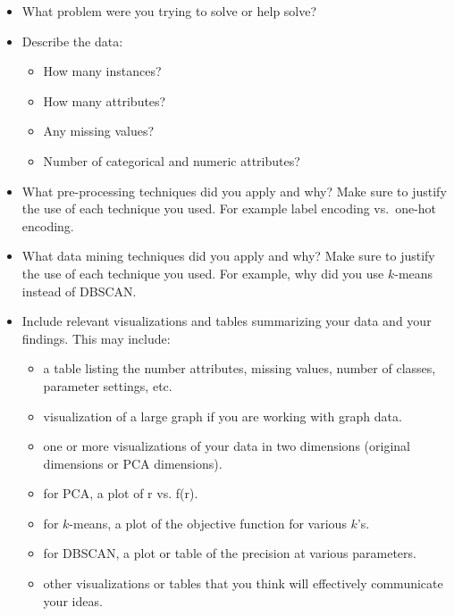 \documentclass[11pt]{article}
\begin{document}
\begin{itemize}
    \item What problem were you trying to solve or help solve?

    \item Describe the data:
    \begin{itemize}
        \item How many instances?
        \item How many attributes?
        \item Any missing values?
        \item Number of categorical and numeric attributes?
    \end{itemize}

    \item What pre-processing techniques did you apply and why? Make sure to
    justify the use of each technique you used. For example label encoding
    vs.~one-hot encoding.

    \item What data mining techniques did you apply and why? Make sure to
    justify the use of each technique you used. For example, why did you use
    $k$-means instead of DBSCAN.

    \item Include relevant visualizations and tables summarizing your data and
    your findings. This may include:
    \begin{itemize}

        \item a table listing the number attributes, missing values, number of
        classes, parameter settings, etc.

        \item visualization of a large graph if you are working with graph data.

        \item one or more visualizations of your data in two dimensions
        (original dimensions or PCA dimensions).

        \item for PCA, a plot of r vs. f(r).

        \item for $k$-means, a plot of the objective function for various $k$'s.

        \item for DBSCAN, a plot or table of the precision at various
        parameters.

        \item other visualizations or tables that you think will effectively
        communicate your ideas.


\end{itemize}
\end{itemize}
\end{document}
